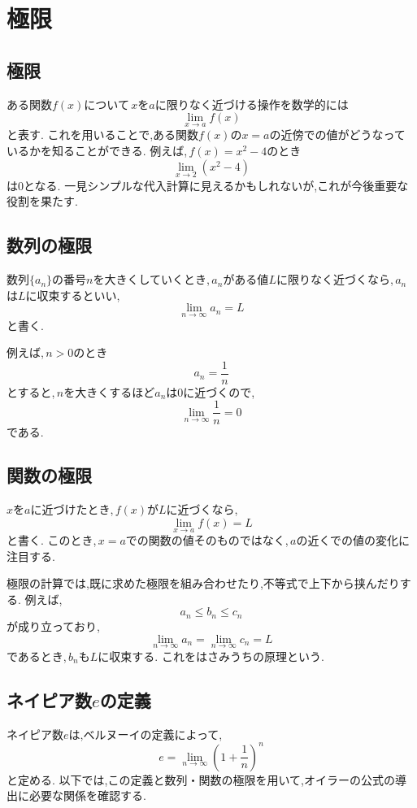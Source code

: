 
\section{極限}\label{節：極限}
  \subsection{極限}\label{節：極限：極限}
    ある関数$f(x)$について\,$x$を$a$に限りなく近づける操作を数学的には
    \[
      \lim_{x\to a} f(x)
    \]
    と表す.
    これを用いることで,ある関数$f(x)$の$x=a$の近傍での値がどうなっているかを知ることができる.
    例えば,\,$f(x)=x^2-4$のとき
    \[
      \lim_{x\to 2} (x^2-4)
    \]
    は$0$となる.
    一見シンプルな代入計算に見えるかもしれないが,これが今後重要な役割を果たす.

  \subsection{数列の極限}\label{節：数列の極限}
    数列$\{a_n\}$の番号$n$を大きくしていくとき,\,$a_n$がある値$L$に限りなく近づくなら,\,$a_n$は$L$に収束するといい,
    \[
      \lim_{n\to\infty}a_n=L
    \]
    と書く.
    
    例えば,\,$n>0$のとき
    \[
      a_n=\frac{1}{n}
    \]
    とすると,\,$n$を大きくするほど$a_n$は$0$に近づくので,
    \[
      \lim_{n\to\infty}\frac{1}{n}=0
    \]
    である.

  \subsection{関数の極限}\label{節：関数の極限}
    $x$を$a$に近づけたとき,\,$f(x)$が$L$に近づくなら,
    \[
      \lim_{x\to a}f(x)=L
    \]
    と書く.
    このとき,\,$x=a$での関数の値そのものではなく,\,$a$の近くでの値の変化に注目する.

    極限の計算では,既に求めた極限を組み合わせたり,不等式で上下から挟んだりする.
    例えば,
    \[
      a_n\le b_n\le c_n
    \]
    が成り立っており,
    \[
      \lim_{n\to\infty}a_n=\lim_{n\to\infty}c_n=L
    \]
    であるとき,\,$b_n$も$L$に収束する.
    これをはさみうちの原理という.

  \subsection{ネイピア数$e$の定義}\label{節：ネイピア数eの定義}
    ネイピア数$e$は,ベルヌーイの定義によって,
    \[
      e=\lim_{n\to\infty}\left(1+\frac{1}{n}\right)^n
    \]
    と定める.
    以下では,この定義と数列・関数の極限を用いて,オイラーの公式の導出に必要な関係を確認する.

